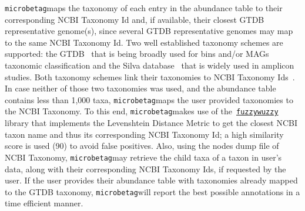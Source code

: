 \documentclass[sn-mathphys,Numbered]{sn-jnl}  %
\theoremstyle{thmstyleone}%
\theoremstyle{thmstyletwo}%
\theoremstyle{thmstylethree}%
\newcommand{\microbetag}{\texttt{microbetag}}
\begin{document}
        \microbetag maps the taxonomy of each entry in the abundance table to their corresponding NCBI Taxonomy Id and, if available, their closest GTDB representative genome(s), since several GTDB representative genomes may map to the same NCBI Taxonomy Id.
        Two well established taxonomy schemes are supported: the GTDB~\cite{parks2022gtdb} that is being broadly used for bins and/or MAGs taxonomic classification and the Silva database~\cite{quast2012silva} that is widely used in amplicon studies. Both taxonomy schemes link their taxonomies to NCBI Taxonomy Ids~\cite{schoch2020ncbi}.
        In case neither of those two taxonomies was used, and the abundance table contains less than 1,000 taxa, \microbetag maps the user provided taxonomies to the NCBI Taxonomy. 
        To this end, \microbetag makes use of the~\href{https://github.com/seatgeek/thefuzz}{\texttt{fuzzywuzzy}} library that implements the Levenshtein Distance Metric to get the closest NCBI taxon name and thus its corresponding NCBI Taxonomy Id; a high similarity score is used (90) to avoid false positives. 
        Also, using the nodes dump file of NCBI Taxonomy, \microbetag may retrieve the child taxa of a taxon in user's data, along with their corresponding NCBI Taxonomy Ids, if requested by the user.
        If the user provides their abundance table with taxonomies already mapped to the GTDB taxonomy, \microbetag will report the best possible annotations in a time efficient manner. 
        
        
        
\end{document}
